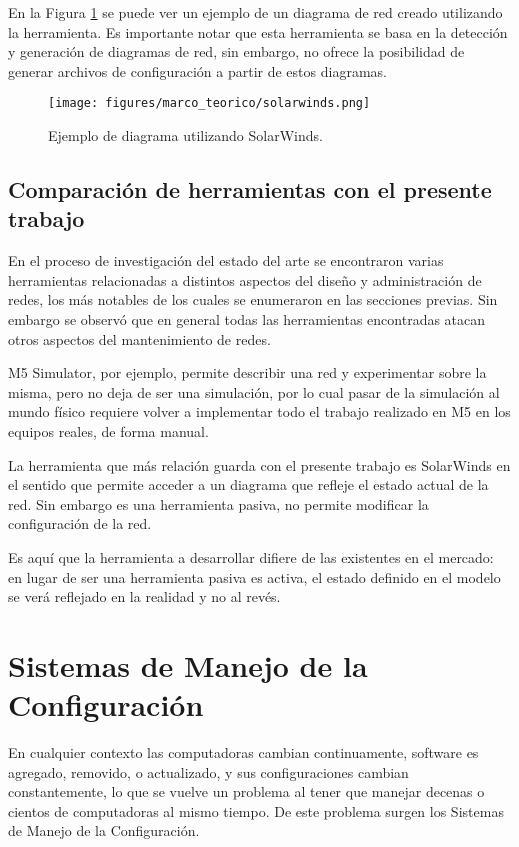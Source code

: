 En la Figura \ref{fig:marco:solarwinds} se puede ver un ejemplo de un diagrama de red creado utilizando la herramienta.
Es importante notar que esta herramienta se basa en la detección y generación de diagramas de red, sin embargo, no ofrece la posibilidad de generar archivos de configuración a partir de estos diagramas.

\begin{figure}[htbp]
    \centering
    \texttt{[image: figures/marco\_teorico/solarwinds.png]}
    \caption{Ejemplo de diagrama utilizando SolarWinds. \cite{solarwinds}}
    \label{fig:marco:solarwinds}
\end{figure}

\subsection{Comparación de herramientas con el presente trabajo}

En el proceso de investigación del estado del arte se encontraron varias herramientas relacionadas a distintos aspectos del diseño y administración de redes, los más notables de los cuales se enumeraron en las secciones previas. Sin embargo se observó que en general todas las herramientas encontradas atacan otros aspectos del mantenimiento de redes.

M5 Simulator, por ejemplo, permite describir una red y experimentar sobre la misma, pero no deja de ser una simulación, por lo cual pasar de la simulación al mundo físico requiere volver a implementar todo el trabajo realizado en M5 en los equipos reales, de forma manual.

La herramienta que más relación guarda con el presente trabajo es SolarWinds en el sentido que permite acceder a un diagrama que refleje el estado actual de la red. Sin embargo es una herramienta pasiva, no permite modificar la configuración de la red.

Es aquí que la herramienta a desarrollar difiere de las existentes en el mercado: en lugar de ser una herramienta pasiva es activa, el estado definido en el modelo se verá reflejado en la realidad y no al revés.

\section{Sistemas de Manejo de la Configuración} \label{Sistemas de Manejo de la Configuracion}

En cualquier contexto las computadoras cambian continuamente, software es agregado, removido, o actualizado, y sus configuraciones cambian constantemente, lo que se vuelve un problema al tener que manejar decenas o cientos de computadoras al mismo tiempo. De este problema surgen los Sistemas de Manejo de la Configuración.

